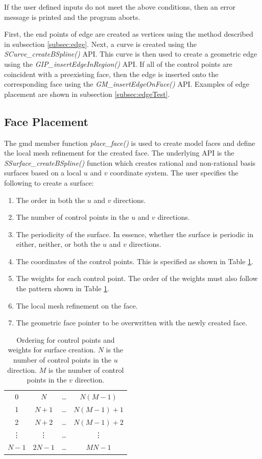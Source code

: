 \documentclass[a4paper, 12pt]{article}
\begin{document}
If the user defined inputs do not meet the above conditions, then an error 
message is printed and the program aborts.

First, the end points of edge are created as vertices using the 
method described in subsection \ref{subsec:edge}. Next, a curve
is created using the \emph{SCurve\_createBSpline()} API. This 
curve is then used to create a geometric edge using the 
\emph{GIP\_insertEdgeInRegion()} API. If all of the 
control points are coincident with a preexisting face, then the
edge is inserted onto the corresponding face using the 
\emph{GM\_insertEdgeOnFace()} API. Examples of edge placement
are shown in subsection \ref{subsec:edgeTest}.

\subsection{Face Placement} \label{subsec:face}
The gmd member function \emph{place\_face()} is used to create model 
faces and define the local mesh refinement for the created face. The
underlying API is the \emph{SSurface\_createBSpline()} function which creates 
rational and non-rational basis surfaces based on a local $u$ and $v$ 
coordinate system.  The user specifies the following to create a surface:
\begin{enumerate}
  \item The order in both the $u$ and $v$ directions.
  \item The number of control points in the $u$ and $v$ directions.
  \item The periodicity of the surface. In essence, whether the 
      surface is periodic in either, neither, or both the $u$ and $v$ directions.
  \item The coordinates of the control points. This is specified as shown in
      Table \ref{table:cpNum}.
  \item The weights for each control point. The order of the weights must
      also follow the pattern shown in Table \ref{table:cpNum}.
  \item The local mesh refinement on the face. 
  \item The geometric face pointer to be overwritten with the newly created face.
\end{enumerate}

\begin{table}[H]
  \centering
  \begin{tabular}{ c c c c}
    0        & $N$     & \dots  & $N(M-1)$   \\
    1        & $N+1$   & \dots  & $N(M-1)+1$ \\
    2        & $N+2$   & \dots  & $N(M-1)+2$ \\
    \vdots   & \vdots  & \dots  & \vdots     \\
    $N-1$    & $2N-1$  & \dots  & $MN-1$     \\

  \end{tabular}
  \caption{Ordering for control points and weights for surface creation. $N$ is 
    the number of control points in the $u$ direction. $M$ is the number of
    control points in the $v$ direction.}
  \label{table:cpNum}
\end{table}
\end{document}
